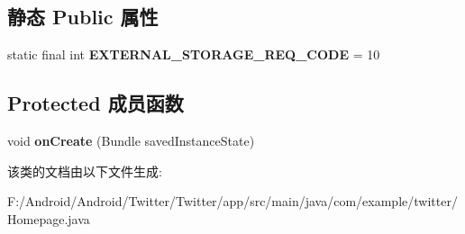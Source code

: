 \subsection*{静态 Public 属性}
\begin{DoxyCompactItemize}
\item 
\mbox{\label{classcom_1_1example_1_1twitter_1_1_homepage_aff42479bdc01c355dba0d75016d75e9a}} 
static final int {\bfseries E\+X\+T\+E\+R\+N\+A\+L\+\_\+\+S\+T\+O\+R\+A\+G\+E\+\_\+\+R\+E\+Q\+\_\+\+C\+O\+DE} = 10
\end{DoxyCompactItemize}
\subsection*{Protected 成员函数}
\begin{DoxyCompactItemize}
\item 
\mbox{\label{classcom_1_1example_1_1twitter_1_1_homepage_a74073ffa6366b3c331781a74341a2e3a}} 
void {\bfseries on\+Create} (Bundle saved\+Instance\+State)
\end{DoxyCompactItemize}


该类的文档由以下文件生成\+:\begin{DoxyCompactItemize}
\item 
F\+:/\+Android/\+Android/\+Twitter/\+Twitter/app/src/main/java/com/example/twitter/Homepage.\+java\end{DoxyCompactItemize}

